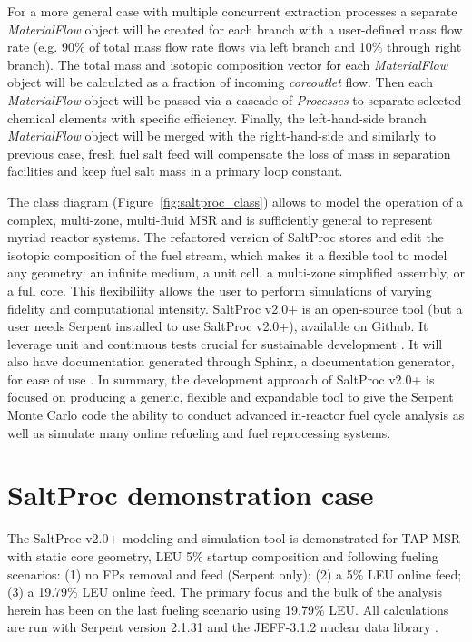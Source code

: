 \documentclass[12pt]{article} %
\begin{document}
For a more general case with multiple concurrent extraction processes a separate 
\textit{MaterialFlow} object will be created for each branch with a user-defined 
mass flow rate (e.g. 90\% of total mass flow rate flows via left branch and 
10\% through right branch). The total mass and isotopic composition vector 
for each \textit{MaterialFlow} object will be calculated as a fraction of incoming 
\textit{core\textunderscore outlet} flow. Then each \textit{MaterialFlow} object will be passed via a cascade of \textit{Processes} to separate selected chemical elements with 
specific efficiency. Finally, the left-hand-side branch \textit{MaterialFlow} object 
will be merged with the right-hand-side and similarly to previous case, fresh 
fuel salt feed will compensate the loss of mass in separation facilities and keep 
fuel salt mass in a primary loop constant.

The class diagram (Figure~\ref{fig:saltproc_class}) allows to model 
the operation of a complex, multi-zone, 
multi-fluid \gls{MSR} and is sufficiently general to represent myriad reactor 
systems. The refactored version of SaltProc stores and edit the 
isotopic composition of the fuel stream, which makes it a flexible tool to 
model any geometry: an infinite medium, a unit cell, a multi-zone simplified 
assembly, or a full core. This flexibiliity allows the user to perform 
simulations of varying fidelity and computational intensity. SaltProc v2.0+ is an 
open-source tool (but a user needs Serpent installed to use SaltProc v2.0+), 
available on Github. It leverage unit and continuous tests  
crucial for sustainable development \cite{krekel_pytest_2004}. It will also 
have documentation generated through Sphinx, a documentation generator, for ease 
of use \cite{brandl_sphinx_2009}. In summary, the 
development approach of SaltProc v2.0+ is focused on producing a generic, flexible and 
expandable tool to give the Serpent Monte Carlo code the ability to conduct 
advanced in-reactor fuel cycle analysis as well as simulate many 
online refueling and fuel reprocessing systems.

\section{SaltProc demonstration case}
The SaltProc v2.0+ modeling and simulation tool is demonstrated
for \gls{TAP} \gls{MSR} with static core geometry, \gls{LEU} 5\% 
startup composition 
\cite{transatomic_power_corporation_neutronics_2016} and following 
fueling scenarios: (1) no \glspl{FP} removal and feed (Serpent only);
(2) a 5\% \gls{LEU} online feed; (3) a 19.79\% 
\gls{LEU} online feed. 
The primary focus and the bulk of the analysis 
herein has been on the last fueling scenario using 
19.79\% \gls{LEU}. All calculations are run with 
Serpent version 2.1.31 and the JEFF-3.1.2 nuclear data library 
\cite{leppanen_serpent_2013, oecd/nea_data_bank_jeff-3.1.2_2014}.
\end{document}
